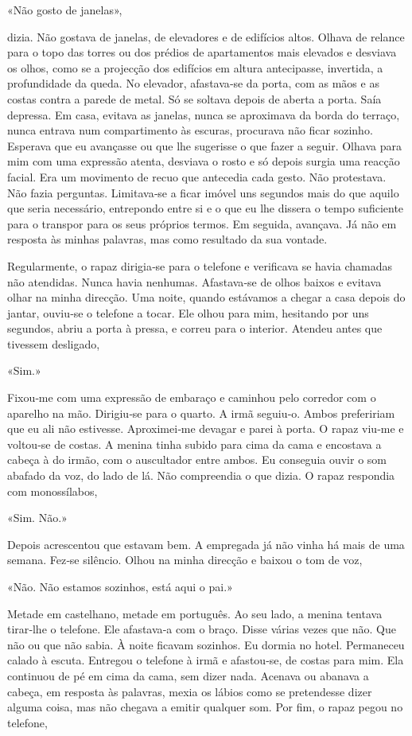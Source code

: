 «Não gosto de janelas»,

dizia. Não gostava de janelas, de elevadores e de edifícios altos.
Olhava de relance para o topo das torres ou dos prédios de apartamentos
mais elevados e desviava os olhos, como se a projecção dos edifícios em
altura antecipasse, invertida, a profundidade da queda. No elevador,
afastava­‑se da porta, com as mãos e as costas contra a parede de metal.
Só se soltava depois de aberta a porta. Saía depressa. Em casa, evitava
as janelas, nunca se aproximava da borda do terraço, nunca entrava num
compartimento às escuras, procurava não ficar sozinho. Esperava que eu
avançasse ou que lhe sugerisse o que fazer a seguir. Olhava para mim com
uma expressão atenta, desviava o rosto e só depois surgia uma reacção
facial. Era um movimento de recuo que antecedia cada gesto. Não
protestava. Não fazia perguntas. Limitava­‑se a ficar imóvel uns
segundos mais do que aquilo que seria necessário, entrepondo entre si e
o que eu lhe dissera o tempo suficiente para o transpor para os seus
próprios termos. Em seguida, avançava. Já não em resposta às minhas
palavras, mas como resultado da sua vontade.

Regularmente, o rapaz dirigia­‑se para o telefone e verificava se havia
chamadas não atendidas. Nunca havia nenhumas. Afastava­‑se de olhos
baixos e evitava olhar na minha direcção. Uma noite, quando estávamos a
chegar a casa depois do jantar, ouviu­‑se o telefone a tocar. Ele olhou
para mim, hesitando por uns segundos, abriu a porta à pressa, e correu
para o interior. Atendeu antes que tivessem desligado,

«Sim.»

Fixou­‑me com uma expressão de embaraço e caminhou pelo corredor com o
aparelho na mão. Dirigiu­‑se para o quarto. A irmã seguiu­‑o. Ambos
prefeririam que eu ali não estivesse. Aproximei­‑me devagar e parei à
porta. O rapaz viu­‑me e voltou­‑se de costas. A menina tinha subido
para cima da cama e encostava a cabeça à do irmão, com o auscultador
entre ambos. Eu conseguia ouvir o som abafado da voz, do lado de lá. Não
compreendia o que dizia. O rapaz respondia com monossílabos,

«Sim. Não.»

Depois acrescentou que estavam bem. A empregada já não vinha há mais de
uma semana. Fez­‑se silêncio. Olhou na minha direcção e baixou o tom de
voz,

«Não. Não estamos sozinhos, está aqui o pai.»

Metade em castelhano, metade em português. Ao seu lado, a menina tentava
tirar­‑lhe o telefone. Ele afastava­‑a com o braço. Disse várias vezes
que não. Que não ou que não sabia. À noite ficavam sozinhos. Eu dormia
no hotel. Permaneceu calado à escuta. Entregou o telefone à irmã e
afastou­‑se, de costas para mim. Ela continuou de pé em cima da cama,
sem dizer nada. Acenava ou abanava a cabeça, em resposta às palavras,
mexia os lábios como se pretendesse dizer alguma coisa, mas não chegava
a emitir qualquer som. Por fim, o rapaz pegou no telefone,


